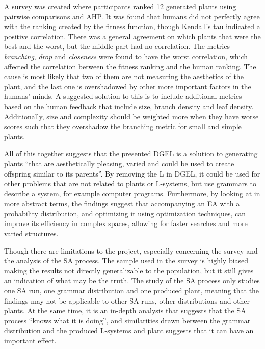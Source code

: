 A survey was created where participants ranked 12 generated plants using pairwise comparisons and \gls{AHP}.
It was found that humans did not perfectly agree with the ranking created by the fitness function, though Kendall's tau indicated a positive correlation.
There was a general agreement on which plants that were the best and the worst, but the middle part had no correlation.
The metrics \textit{branching}, \textit{drop} and \textit{closeness} were found to have the worst correlation, which affected the correlation between the fitness ranking and the human ranking.
The cause is most likely that two of them are not measuring the aesthetics of the plant, and the last one is overshadowed by other more important factors in the humans' minds.
A suggested solution to this is to include additional metrics based on the human feedback that include size, branch density and leaf density.
Additionally, size and complexity should be weighted more when they have worse scores such that they overshadow the branching metric for small and simple plants.

All of this together suggests that the presented \gls{DGEL} is a solution to generating plants ``that are aesthetically pleasing, varied and could be used to create offspring similar to its parents''.
By removing the L in \gls{DGEL}, it could be used for other problems that are not related to plants or \glspl{L-system}, but use grammars to describe a system, for example computer programs.
Furthermore, by looking at in more abstract terms, the findings suggest that accompanying an \gls{EA} with a probability distribution, and optimizing it using optimization techniques, can improve its efficiency in complex spaces, allowing for faster searches and more varied structures.

Though there are limitations to the project, especially concerning the survey and the analysis of the \gls{SA} process.
The sample used in the survey is highly biased making the results not directly generalizable to the population, but it still gives an indication of what may be the truth.
The study of the \gls{SA} process only studies one \gls{SA} run, one grammar distribution and one produced plant, meaning that the findings may not be applicable to other \gls{SA} runs, other distributions and other plants.
At the same time, it is an in-depth analysis that suggests that the \gls{SA} process ``knows what it is doing'', and similarities drawn between the grammar distribution and the produced \glspl{L-system} and plant suggests that it can have an important effect.

